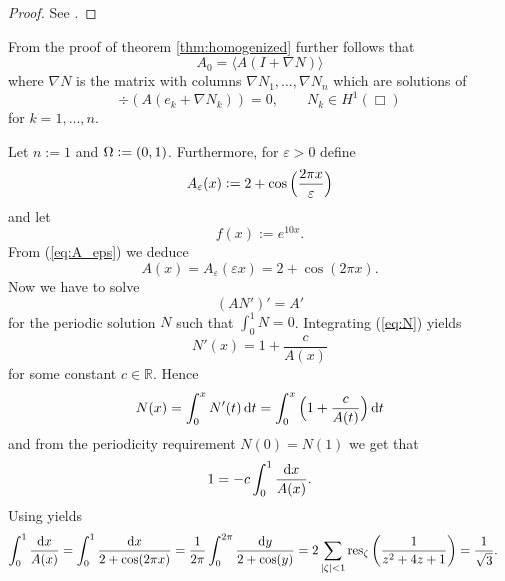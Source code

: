 \begin{proof}
See \cite[19]{jikov:homogenization:1994}.
\end{proof}

From the proof of theorem \ref{thm:homogenized} further follows that 
\begin{equation}
A_0 = \langle A(I + \nabla N)\rangle
\end{equation}
\noindent where $\nabla N$ is the matrix with columns $\nabla N_1,\dots,\nabla N_n$ which are solutions of 
\begin{equation}
\div(A(e_k + \nabla N_k)) = 0, \qquad N_k \in H^1(\Box)
\end{equation}
\noindent for $k = 1,\dots,n$.

\begin{example}
	Let $n := 1$ and $\Omega := \intoo{0,1}$. Furthermore, for $\varepsilon > 0$ define
	\begin{equation}
		A_\varepsilon(x) := 2 + \cos\del[2]{\frac{2\pi x}{\varepsilon}}
		\label{eq:A_eps}
	\end{equation}
	\noindent and let
	\begin{equation}
	f(x) := e^{10x}.
	\end{equation}
	From (\ref{eq:A_eps}) we deduce
	\begin{equation}
		A(x) = A_\varepsilon(\varepsilon x) = 2 + \cos(2\pi x).
	\end{equation}
	Now we have to solve
	\begin{equation}
		(AN')' = A'
		\label{eq:N}
	\end{equation}
	\noindent for the periodic solution $N$ such that $\int_0^1 N = 0$. Integrating (\ref{eq:N}) yields
	\begin{equation}
		N'(x) = 1 + \frac{c}{A(x)}
	\end{equation}
	\noindent for some constant $c \in \mathbb{R}$. Hence
	\begin{equation}
		N(x) = \int_0^x N'(t) \d t = \int_0^x \del[2]{1 + \frac{c}{A(t)}}\d t
	\end{equation}
	\noindent and from the periodicity requirement $N(0) = N(1)$ we get that
	\begin{equation}
		1 = - c \int_0^1 \frac{\mathop{}\!\mathrm{d} x}{A(x)}.
	\end{equation}
	Using \cite[170]{fischer:funktionentheorie:2003} yields
	\begin{align*}
		\int_0^1 \frac{\d x}{A(x)} &= \int_0^1 \frac{\d x}{2 + \cos(2\pi x)} = \frac{1}{2\pi}\int_0^{2\pi} \frac{\d y}{2 + \cos(y)} = 2\sum_{\abs[0]{\zeta} < 1} \res_\zeta \del{\frac{1}{z^2 + 4z + 1}} = \frac{1}{\sqrt{3}}.

\end{align*}
\end{example}

